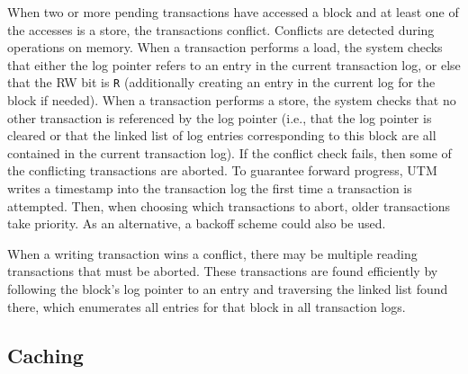 When two or more pending transactions have accessed a block and at
least one of the accesses is a store, the transactions conflict.
Conflicts are detected during operations on memory.  When a
transaction performs a load, the system checks that either the log
pointer refers to an entry in the current transaction log, or else
that the RW bit is \texttt{R} (additionally creating an entry in the
current log for the block if needed).  When a transaction performs a
store, the system checks that no other transaction is referenced by
the log pointer (i.e., that the log pointer is cleared or that the
linked list of log entries corresponding to this block are all
contained in the current transaction log).  If the conflict check
fails, then some of the conflicting transactions are aborted.  To
guarantee forward progress, UTM writes a timestamp into the
transaction log the first time a transaction is attempted.  Then, when
choosing which transactions to abort, older transactions take
priority.  As an alternative, a backoff scheme \cite{MetcalfeBo76}
could also be used.

When a writing transaction wins a conflict, there may be multiple
reading transactions that must be aborted.  These transactions are
found efficiently by following the block's log pointer to an entry and
traversing the linked list found there, which enumerates all entries
for that block in all transaction logs.

\subsection{Caching}

